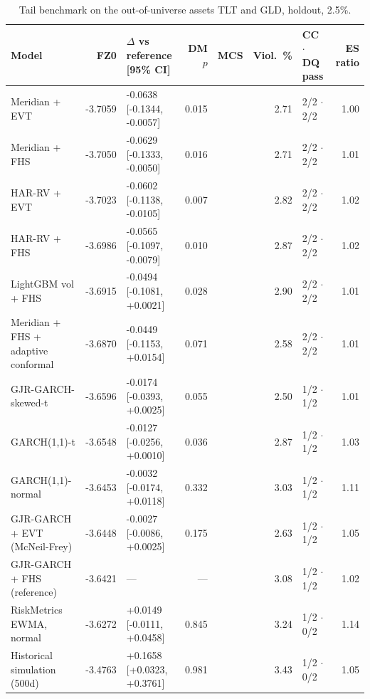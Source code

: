 \begin{table}[!htbp]
\centering
\scriptsize
\caption{Tail benchmark on the out-of-universe assets TLT and GLD, holdout, 2.5\%.}
\label{tab:tailbreadth}
\begin{tabularx}{\linewidth}{>{\raggedright\arraybackslash}X r l r c r l r}
\toprule
\textbf{Model} & \textbf{FZ0} & \textbf{$\Delta$ vs reference [95\% CI]} & \textbf{DM $p$} & \textbf{MCS} & \textbf{Viol.\ \%} & \textbf{CC $\cdot$ DQ pass} & \textbf{ES ratio} \\
\midrule
\rowcolor{good}Meridian + EVT & -3.7059 & -0.0638 [-0.1344, -0.0057] & 0.015 &  & 2.71 & 2/2 $\cdot$ 2/2 & 1.00 \\
\rowcolor{good}Meridian + FHS & -3.7050 & -0.0629 [-0.1333, -0.0050] & 0.016 &  & 2.71 & 2/2 $\cdot$ 2/2 & 1.01 \\
HAR-RV + EVT & -3.7023 & -0.0602 [-0.1138, -0.0105] & 0.007 &  & 2.82 & 2/2 $\cdot$ 2/2 & 1.02 \\
HAR-RV + FHS & -3.6986 & -0.0565 [-0.1097, -0.0079] & 0.010 &  & 2.87 & 2/2 $\cdot$ 2/2 & 1.02 \\
LightGBM vol + FHS & -3.6915 & -0.0494 [-0.1081, +0.0021] & 0.028 &  & 2.90 & 2/2 $\cdot$ 2/2 & 1.01 \\
\rowcolor{good}Meridian + FHS + adaptive conformal & -3.6870 & -0.0449 [-0.1153, +0.0154] & 0.071 &  & 2.58 & 2/2 $\cdot$ 2/2 & 1.01 \\
GJR-GARCH-skewed-t & -3.6596 & -0.0174 [-0.0393, +0.0025] & 0.055 &  & 2.50 & 1/2 $\cdot$ 1/2 & 1.01 \\
GARCH(1,1)-t & -3.6548 & -0.0127 [-0.0256, +0.0010] & 0.036 &  & 2.87 & 1/2 $\cdot$ 1/2 & 1.03 \\
GARCH(1,1)-normal & -3.6453 & -0.0032 [-0.0174, +0.0118] & 0.332 &  & 3.03 & 1/2 $\cdot$ 1/2 & 1.11 \\
GJR-GARCH + EVT (McNeil-Frey) & -3.6448 & -0.0027 [-0.0086, +0.0025] & 0.175 &  & 2.63 & 1/2 $\cdot$ 1/2 & 1.05 \\
GJR-GARCH + FHS (reference) & -3.6421 & --- & --- &  & 3.08 & 1/2 $\cdot$ 1/2 & 1.02 \\
\rowcolor{bad}RiskMetrics EWMA, normal & -3.6272 & +0.0149 [-0.0111, +0.0458] & 0.845 &  & 3.24 & 1/2 $\cdot$ 0/2 & 1.14 \\
\rowcolor{bad}Historical simulation (500d) & -3.4763 & +0.1658 [+0.0323, +0.3761] & 0.981 &  & 3.43 & 1/2 $\cdot$ 0/2 & 1.05 \\
\bottomrule
\end{tabularx}
\end{table}
